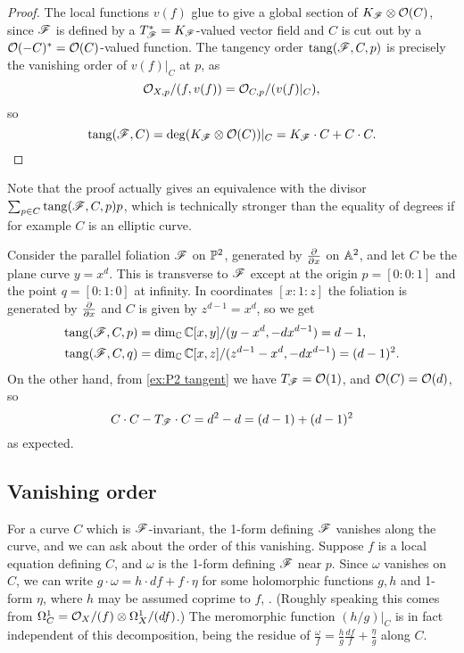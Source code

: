 \begin{proof}
    The local functions $v(f)$ glue to give a global section of
    $K_\scrF\otimes\O(C)$, since $\scrF$ is defined by a
    $T_\scrF^*=K_\scrF$-valued vector field and $C$ is cut out by a
    $\O(-C)^*=\O(C)$-valued function. The tangency order $\tang(\scrF,C,p)$ is
    precisely the vanishing order of $v(f)|_C$ at $p$, as
    \begin{equation*}
        \O_{X,p}/(f,v(f)) = \O_{C,p}/(v(f)|_C),
    \end{equation*}
    so
    \begin{equation*}
        \tang(\scrF,C)
            = \deg(K_\scrF\otimes\O(C))|_C
            = K_\scrF\cdot C + C\cdot C.
    \end{equation*}
\end{proof}

\begin{remark}
    Note that the proof actually gives an equivalence with the divisor
    $\sum_{p\in C}\tang(\scrF,C,p)p$, which is technically stronger than the
    equality of degrees if for example $C$ is an elliptic curve.
\end{remark}

\begin{example}
    Consider the parallel foliation $\scrF$ on $\P^2$, generated by $\pdv{}{x}$
    on $\A^2$, and let $C$ be the plane curve $y=x^d$. This is transverse to
    $\scrF$ except at the origin $p=[0:0:1]$ and the point $q=[0:1:0]$ at
    infinity. In coordinates $[x:1:z]$ the foliation is generated by $\pdv{}{x}$
    and $C$ is given by $z^{d-1}=x^d$, so we get
    \begin{align*}
        \tang(\scrF,C,p) &= \dim_\C\C[x,y]/(y-x^d,-dx^{d-1}) = d-1, \\
        \tang(\scrF,C,q) &= \dim_\C\C[x,z]/(z^{d-1}-x^d,-dx^{d-1}) = (d-1)^2.
    \end{align*}
    On the other hand, from \cref{ex:P2 tangent} we have $T_\scrF=\O(1)$, and
    $\O(C)=\O(d)$, so
    \begin{equation*}
        C\cdot C - T_\scrF\cdot C = d^2 - d = (d-1) + (d-1)^2
    \end{equation*}
    as expected.
\end{example}

\subsection{Vanishing order}

For a curve $C$ which is $\scrF$-invariant, the 1-form defining $\scrF$ vanishes
along the curve, and we can ask about the order of this vanishing. Suppose $f$
is a local equation defining $C$, and $\omega$ is the 1-form defining $\scrF$
near $p$. Since $\omega$ vanishes on $C$, we can write
$g\cdot\omega=h\cdot df+f\cdot\eta$ for some holomorphic functions $g,h$ and
1-form $\eta$, where $h$ may be assumed coprime to $f$, \cite{neto_86}. (Roughly
speaking this comes from $\Omega^1_C=\O_X/(f)\otimes\Omega^1_X/(df)$.) The
meromorphic function $(h/g)|_C$ is in fact independent of this decomposition,
being the residue of $\frac{\omega}{f}=\frac{h}{g}\frac{df}{f}+\frac{\eta}{g}$
along $C$.

